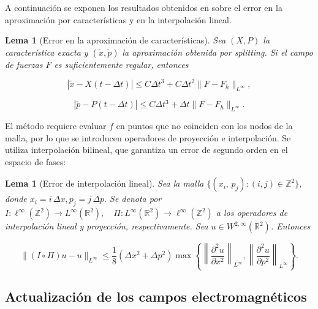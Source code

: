 \documentclass[11pt,a4paper,twoside,pdf]{article}
\numberwithin{equation}{section}
\newtheorem{lemma}[theorem]{Lema}
\begin{document}
A continuación se exponen los resultados obtenidos en \cite{bostan2009convergence} sobre el error en la aproximación por características y en la interpolación lineal.

\begin{lemma}[Error en la aproximación de características]
Sea $(X,P)$ la característica exacta y $(\tilde{x},\tilde{p})$ la aproximación obtenida por
splitting. Si el campo de fuerzas $F$ es suficientemente regular, entonces


\[
|\tilde{x}-X(t-\Delta t)| \le C\Delta t^3 + C\Delta t^2\|F-F_h\|_{L^\infty},
\]




\[
|\tilde{p}-P(t-\Delta t)| \le C\Delta t^3 + \Delta t\|F-F_h\|_{L^\infty}.
\]


\end{lemma}






El método requiere evaluar $f$ en puntos que no coinciden con los nodos de la
malla, por lo que se introducen operadores de proyección e interpolación. Se utiliza
interpolación bilineal, que garantiza un error de segundo orden en el espacio de
fases:

\begin{lemma}[Error de interpolación lineal]

Sea la malla $\{(x_i,\, p_j) : (i,j)\in \mathbb{Z}^2\},$ donde $x_i = i\,\Delta x, p_j = j\,\Delta p.$ Se denota por $I : \ell^\infty(\mathbb{Z}^2) \longrightarrow L^\infty(\mathbb{R}^2), 
\quad 
\Pi : L^\infty(\mathbb{R}^2) \longrightarrow \ell^\infty(\mathbb{Z}^2)$ a los operadores de interpolación lineal y proyección, respectivamente. Sea $u\in W^{2,\infty}(\mathbb{R}^2)$. Entonces


\[
\|(I\circ\Pi)u - u\|_{L^\infty}
\le \frac{1}{8}(\Delta x^2 + \Delta p^2)
\max\left\{
\left\|\frac{\partial^2 u}{\partial x^2}\right\|_{L^\infty},
\left\|\frac{\partial^2 u}{\partial p^2}\right\|_{L^\infty}
\right\}.
\]



\end{lemma}





\subsection{Actualización de los campos electromagnéticos}
\end{document}
